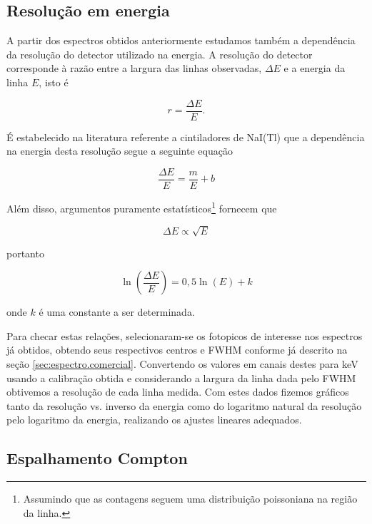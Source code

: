 \documentclass[a4paper, 11pt, notitlepage]{article}
\numberwithin{equation}{section}  %
\begin{document}
\subsection{Resolução em energia}

A partir dos espectros obtidos anteriormente estudamos também a dependência da resolução do detector utilizado na energia. A resolução do detector corresponde à razão entre a largura das linhas observadas, $\Delta E$ e a energia da linha $E$, isto é

\begin{equation*}
  r = \frac{\Delta E}{E}.
\end{equation*}

É estabelecido na literatura referente a cintiladores de NaI(Tl) que a dependência na energia desta resolução segue a seguinte equação \cite{venkataramaiah1978}

\begin{equation}
 \frac{\Delta E}{E} = \frac{m}{E} + b
 \label{eq:resolution}
\end{equation}

Além disso, argumentos puramente estatísticos\footnote{Assumindo que as contagens seguem uma distribuição poissoniana na região da linha.} fornecem que

\begin{equation*}
  \Delta E \propto \sqrt{E}
\end{equation*}

\noindent portanto

\begin{equation*}
  \ln\left(\frac{\Delta E}{E}\right) = 0,5 \ln\left(E\right) + k
\end{equation*}

\noindent onde $k$ é uma constante a ser determinada.

Para checar estas relações, selecionaram-se os fotopicos de interesse nos espectros já obtidos, obtendo seus respectivos centros e FWHM conforme já descrito na seção \ref{sec:espectro.comercial}. Convertendo os valores em canais destes para keV usando a calibração obtida e considerando a largura da linha dada pelo FWHM obtivemos a resolução de cada linha medida. Com estes dados fizemos gráficos tanto da resolução vs. inverso da energia como do logaritmo natural da resolução pelo logaritmo da energia, realizando os ajustes lineares adequados.

\subsection{Espalhamento Compton}
\end{document}
